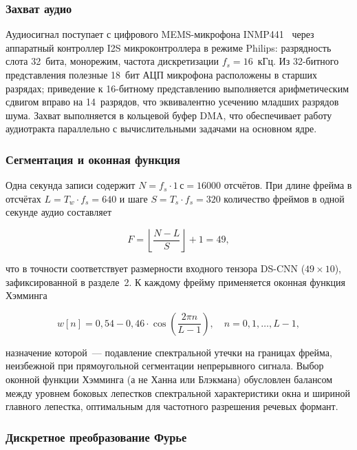 \subsubsection{Захват аудио}

Аудиосигнал поступает с цифрового MEMS-микрофона
INMP441~\cite{src:15} через аппаратный контроллер I2S
микроконтроллера в режиме Philips: разрядность слота 32~бита,
монорежим, частота дискретизации $f_s = 16$~кГц. Из 32-битного
представления полезные 18~бит АЦП микрофона расположены в
старших разрядах; приведение к 16-битному представлению
выполняется арифметическим сдвигом вправо на 14~разрядов, что
эквивалентно усечению младших разрядов шума. Захват выполняется
в кольцевой буфер DMA, что обеспечивает работу аудиотракта
параллельно с вычислительными задачами на основном ядре.

\subsubsection{Сегментация и оконная функция}

Одна секунда записи содержит $N = f_s \cdot 1\,\text{с} = 16000$
отсчётов. При длине фрейма в отсчётах $L = T_w \cdot f_s = 640$
и шаге $S = T_s \cdot f_s = 320$ количество фреймов в одной
секунде аудио составляет

\begin{equation}
	F = \left\lfloor \frac{N - L}{S} \right\rfloor + 1 = 49,
	\label{eq:frame_count}
\end{equation}

что в точности соответствует размерности входного тензора DS-CNN
($49 \times 10$), зафиксированной в разделе~2. К каждому фрейму
применяется оконная функция Хэмминга

\begin{equation}
	w[n] = 0{,}54 - 0{,}46 \cdot \cos\!\left(\frac{2 \pi n}{L - 1}\right),
	\quad n = 0, 1, \ldots, L-1,
	\label{eq:hamming}
\end{equation}

назначение которой~--- подавление спектральной утечки на
границах фрейма, неизбежной при прямоугольной сегментации
непрерывного сигнала. Выбор оконной функции Хэмминга (а не Ханна
или Блэкмана) обусловлен балансом между уровнем боковых
лепестков спектральной характеристики окна и шириной главного
лепестка, оптимальным для частотного разрешения речевых
формант.

\subsubsection{Дискретное преобразование Фурье}

